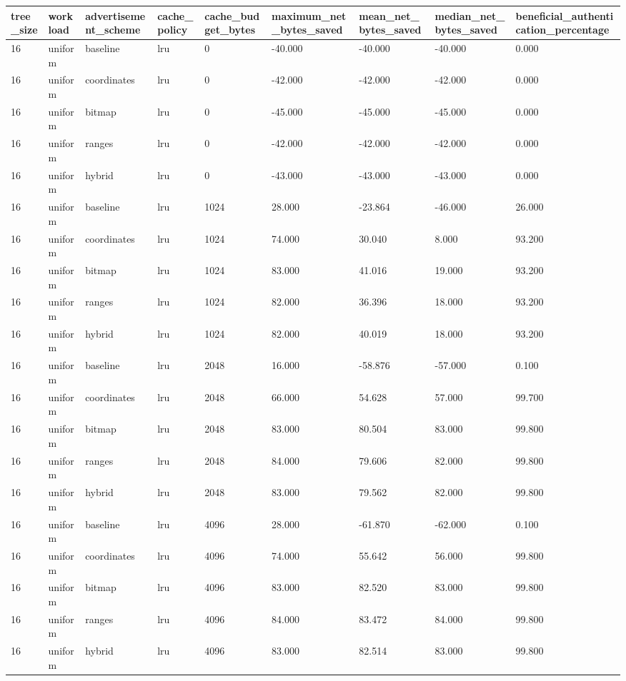 \begin{tabular}{lllllllll}
tree\_size & workload & advertisement\_scheme & cache\_policy & cache\_budget\_bytes & maximum\_net\_bytes\_saved & mean\_net\_bytes\_saved & median\_net\_bytes\_saved & beneficial\_authentication\_percentage \\ \hline
16 & uniform & baseline & lru & 0 & -40.000 & -40.000 & -40.000 & 0.000 \\
16 & uniform & coordinates & lru & 0 & -42.000 & -42.000 & -42.000 & 0.000 \\
16 & uniform & bitmap & lru & 0 & -45.000 & -45.000 & -45.000 & 0.000 \\
16 & uniform & ranges & lru & 0 & -42.000 & -42.000 & -42.000 & 0.000 \\
16 & uniform & hybrid & lru & 0 & -43.000 & -43.000 & -43.000 & 0.000 \\
16 & uniform & baseline & lru & 1024 & 28.000 & -23.864 & -46.000 & 26.000 \\
16 & uniform & coordinates & lru & 1024 & 74.000 & 30.040 & 8.000 & 93.200 \\
16 & uniform & bitmap & lru & 1024 & 83.000 & 41.016 & 19.000 & 93.200 \\
16 & uniform & ranges & lru & 1024 & 82.000 & 36.396 & 18.000 & 93.200 \\
16 & uniform & hybrid & lru & 1024 & 82.000 & 40.019 & 18.000 & 93.200 \\
16 & uniform & baseline & lru & 2048 & 16.000 & -58.876 & -57.000 & 0.100 \\
16 & uniform & coordinates & lru & 2048 & 66.000 & 54.628 & 57.000 & 99.700 \\
16 & uniform & bitmap & lru & 2048 & 83.000 & 80.504 & 83.000 & 99.800 \\
16 & uniform & ranges & lru & 2048 & 84.000 & 79.606 & 82.000 & 99.800 \\
16 & uniform & hybrid & lru & 2048 & 83.000 & 79.562 & 82.000 & 99.800 \\
16 & uniform & baseline & lru & 4096 & 28.000 & -61.870 & -62.000 & 0.100 \\
16 & uniform & coordinates & lru & 4096 & 74.000 & 55.642 & 56.000 & 99.800 \\
16 & uniform & bitmap & lru & 4096 & 83.000 & 82.520 & 83.000 & 99.800 \\
16 & uniform & ranges & lru & 4096 & 84.000 & 83.472 & 84.000 & 99.800 \\
16 & uniform & hybrid & lru & 4096 & 83.000 & 82.514 & 83.000 & 99.800 \\

\end{tabular}

